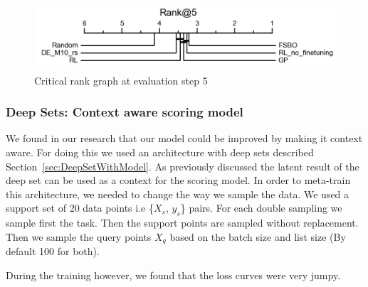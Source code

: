 \documentclass[12pt, twoside, ngerman]{report}
\begin{document}
\begin{figure}[h]
  \centering
    \includegraphics[scale=0.35]{images/RLEvaluationBasicScoringRank5}
    \caption{Critical rank graph at evaluation step 5}
    \label{fig:RLEvaluationBasicScoringRank5}
\end{figure}

\subsubsection{Deep Sets: Context aware scoring model}

We found in our research that our model could be improved by making it context aware.
For doing this we used an architecture with deep sets described Section~\ref{sec:DeepSetWithModel}.
As previously discussed the latent result of the deep set can be used as a context for the scoring model.
In order to meta-train this architecture,  we needed to change the way we sample the data.
We used a support set of 20 data points i.e \{$X_s$, $y_s$\} pairs.
For each double sampling we sample first the task.
Then the support points are sampled without replacement.
Then we sample the query points $X_q$ based on the batch size and list size (By default 100 for both).

During the training however,  we found that the loss curves were very jumpy.
\end{document}
